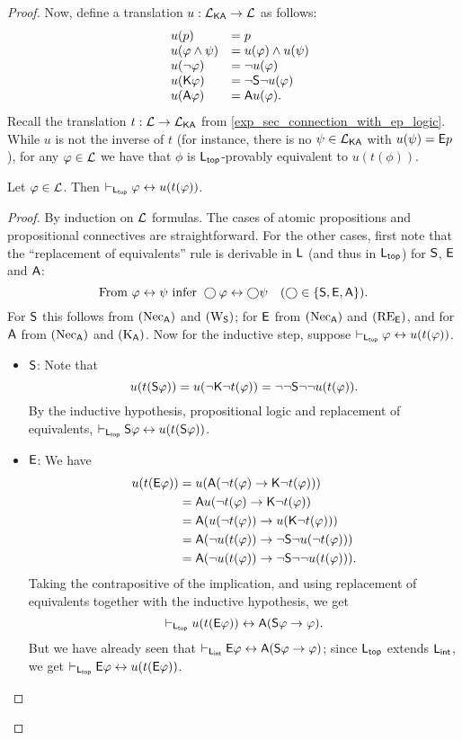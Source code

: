 \begin{proof}
Now, define a translation $u: \cLKA \to \cL$ as follows:
\[
\begin{array}{lll}
 &u(p) &= p \\
 &u(\phi \land \psi) &= u(\phi) \land u(\psi) \\
 &u(\neg\phi) &= \neg u(\phi) \\
 &u(\K\phi) &= \neg\S\neg u(\phi) \\
 &u(\A\phi) &= \A u(\phi).
\end{array}\]
Recall the translation $t: \cL \to \cLKA$ from
\cref{exp_sec_connection_with_ep_logic}. While $u$ is not the inverse of $t$ (for
instance, there is no $\psi \in \cLKA$ with $u(\psi) = \E p$), for any $\phi
\in \cL$ we have that $\phi$ is $\sLtop$-provably equivalent to $u(t(\phi))$.

\begin{claim}
\label{exp_claim_ut_equivalence}
Let $\phi \in \cL$. Then $\entails_{\sLtop}
\phi \liff u(t(\phi))$.
\end{claim}

\begin{proof}

By induction on $\cL$ formulas. The cases of atomic
propositions and propositional connectives are straightforward. For
the other cases, first note that the ``replacement of equivalents''
rule is derivable in $\sL$ (and thus in $\sLtop$) for
$\S$, $\E$ and $\A$:
\[
    \text{From } \phi \liff \psi \text{ infer } \bigcirc\phi \liff
    \bigcirc\psi \quad (\bigcirc \in \{\S, \E, \A\}).
\]
For $\S$ this follows from $\necuniv$ and $\weakeningS$; for $\E$ from
$\necuniv$ and $\reE$, and for $\A$ from $\necuniv$ and $\Kuniv$. Now for the
inductive step, suppose $\entails_{\sLtop} \phi \liff u(t(\phi))$.

\begin{itemize}
    \item $\S$: Note that
        \[
        u(t(\S\phi))
= u(\neg\K\neg t(\phi))
= \neg\neg\S\neg\neg u(t(\phi)).\]
        By the inductive hypothesis, propositional logic and replacement
of equivalents, $\entails_{\sLtop} \S\phi \liff
u(t(\S\phi))$.

        \item $\E$: We have
        \[
        \begin{aligned}
   u(t(\E\phi))
   &= u(\A(\neg t(\phi) \limplies \K\neg t(\phi))) \\
   &= \A u(\neg t(\phi) \limplies \K\neg t(\phi)) \\
   &= \A (u(\neg t(\phi)) \limplies u(\K\neg t(\phi))) \\
   &= \A (\neg u(t(\phi)) \limplies \neg\S\neg u(\neg t(\phi))) \\
   &= \A (\neg u(t(\phi)) \limplies \neg\S\neg \neg u(t(\phi))).
\end{aligned}\]
        Taking the contrapositive of the implication, and using
replacement of equivalents together with the inductive hypothesis,
we get
        \[
        \entails_{\sLtop} u(t(\E\phi))
    \liff
    \A(
       \S\phi \limplies \phi
    ).\]
        But we have already seen that $\entails_{\sLint} \E\phi
\liff \A(\S\phi \limplies \phi)$; since $\sLtop$ extends
$\sLint$, we get $\entails_{\sLtop} \E\phi \liff
u(t(\E\phi))$.


\end{itemize}
\end{proof}
\end{proof}
